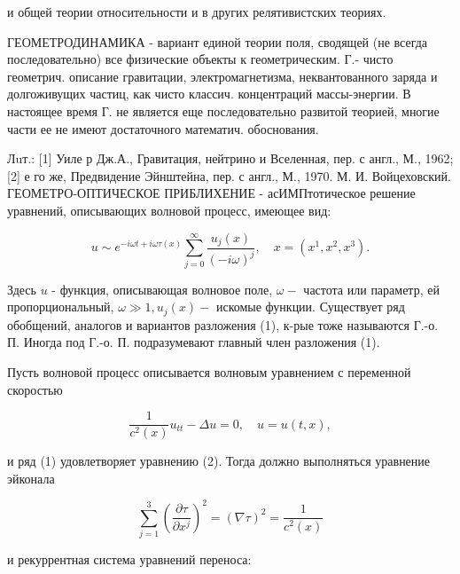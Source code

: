 \documentclass[10pt]{article}
\begin{document}
и общей теории относительности и в других релятивистских теориях.



ГЕОМЕТРОДИНАМИКА - вариант единой теории поля, сводящей (не всегда последовательно) все физические объекты к геометрическим. Г.- чисто геометрич. описание гравитации, электромагнетизма, неквантованного заряда и долгоживущих частиц, как чисто классич. концентраций массы-энергии. В настоящее время Г. не является еще последовательно развитой теорией, многие части ее не имеют достаточного математич. обоснования.



Лuт.: [1] Уиле р Дж.А., Гравитация, нейтрино и Вселенная, пер. с англ., М., 1962; [2] е го же, Предвидение Эйнштейна, пер. с англ., М., 1970. М. И. Войцеховский. ГЕОМЕТРО-ОПТИЧЕСКОЕ ПРИБЛИХЕНИЕ - асИМПтотическое решение уравнений, описывающих волновой процесс, имеющее вид:



\[

u \sim e^{-i \omega t+i \omega \tau(x)} \sum_{j=0}^{\infty} \frac{u_{j}(x)}{(-i \omega)^{j}}, \quad x=\left(x^{1}, x^{2}, x^{3}\right) .

\]



Здесь $u$ - функция, описывающая волновое поле, $\omega-$ частота или параметр, ей пропорциональный, $\omega \gg 1, u_{j}(x)-$ искомые функции. Существует ряд обобщений, аналогов и вариантов разложения (1), к-рые тоже называются Г.-о. П. Иногда под Г.-о. П. подразумевают главный член разложения (1).



Пусть волновой процесс описывается волновым уравнением с переменной скоростью



\[

\frac{1}{c^{2}(x)} u_{t t}-\Delta u=0, \quad u=u(t, x),

\]



и ряд (1) удовлетворяет уравнению (2). Тогда должно выполняться уравнение эйконала



\[

\sum_{j=1}^{3}\left(\frac{\partial \tau}{\partial x^{j}}\right)^{2}=(\nabla \tau)^{2}=\frac{1}{c^{2}(x)}

\]



и рекуррентная система уравнений переноса:
\end{document}
